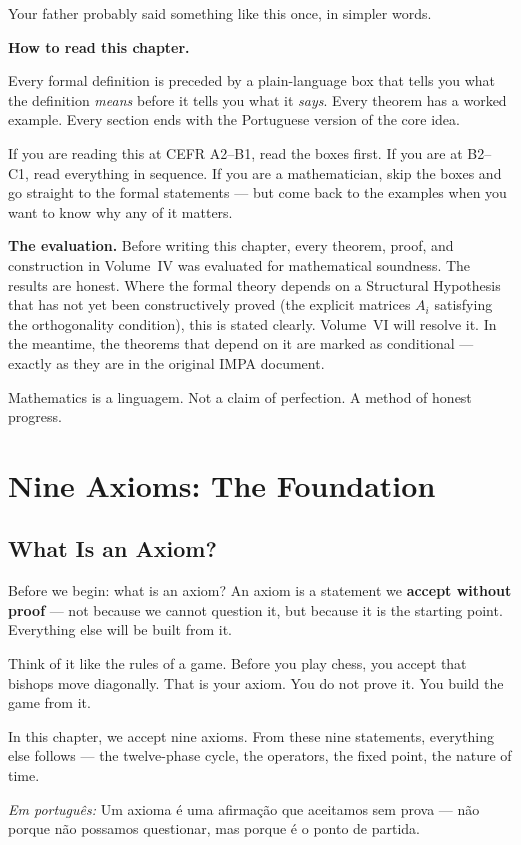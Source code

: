 \documentclass[12pt, openright]{book}
\theoremstyle{definition}
\theoremstyle{remark}
\begin{document}
Your father probably said something like this once, in simpler words.

\medskip

\textbf{How to read this chapter.}

Every formal definition is preceded by a plain-language box that
tells you what the definition \textit{means} before it tells you
what it \textit{says}. Every theorem has a worked example.
Every section ends with the Portuguese version of the core idea.

If you are reading this at CEFR A2--B1, read the boxes first.
If you are at B2--C1, read everything in sequence.
If you are a mathematician, skip the boxes and go straight to
the formal statements --- but come back to the examples when
you want to know why any of it matters.

\medskip

\textbf{The evaluation.}
Before writing this chapter, every theorem, proof, and construction
in Volume~IV was evaluated for mathematical soundness. The results
are honest. Where the formal theory depends on a Structural
Hypothesis that has not yet been constructively proved
(the explicit matrices $A_i$ satisfying the orthogonality condition),
this is stated clearly. Volume~VI will resolve it. In the meantime,
the theorems that depend on it are marked as conditional --- exactly
as they are in the original IMPA document.

Mathematics is a linguagem. Not a claim of perfection.
A method of honest progress.

\chapter{Nine Axioms: The Foundation}
\label{ch:axioms}

\section{What Is an Axiom?}

\begin{studentbox}{Before we begin: what is an axiom?}
An axiom is a statement we \textbf{accept without proof} ---
not because we cannot question it, but because it is the
starting point. Everything else will be built from it.

Think of it like the rules of a game. Before you play chess,
you accept that bishops move diagonally. That is your axiom.
You do not prove it. You build the game from it.

In this chapter, we accept nine axioms. From these nine
statements, everything else follows --- the twelve-phase cycle,
the operators, the fixed point, the nature of time.

\textit{Em português:}
Um axioma é uma afirmação que aceitamos sem prova ---
não porque não possamos questionar, mas porque é o ponto de partida.
\end{studentbox}
\end{document}
